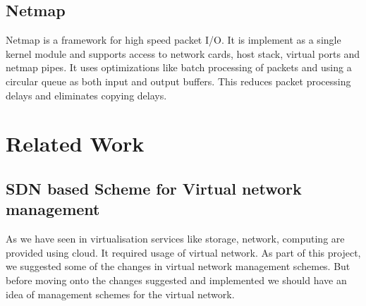 \subsection{Netmap}
Netmap is a framework for high speed packet I/O. It is implement as a single kernel module and supports access to network cards, host stack, virtual ports and netmap pipes. 
It uses optimizations like batch processing of packets and using a circular queue as both input and output buffers. This reduces packet processing delays and eliminates copying delays.


\section{Related Work}
\subsection{SDN based Scheme for Virtual network management}
As we have seen in virtualisation services like storage, network, computing are provided using cloud. It required usage of virtual network. As part of this project, we suggested some of the changes in virtual network management schemes. But before moving onto the changes suggested and implemented we should have an idea of management schemes for the virtual network.

